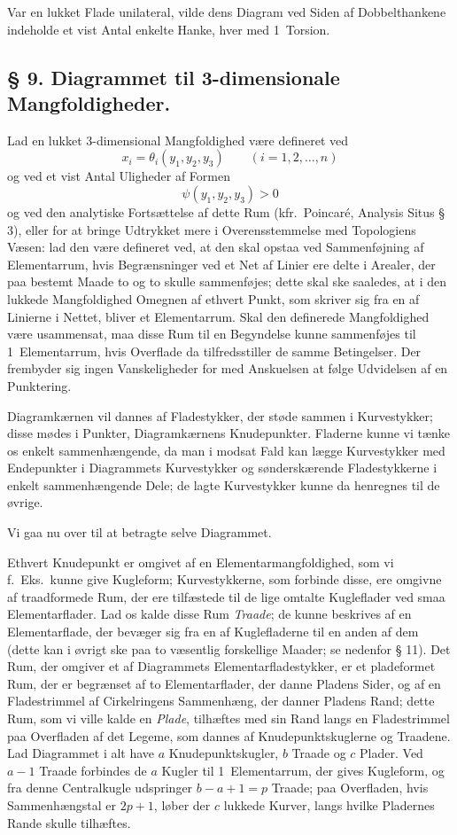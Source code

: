 \documentclass{article}
\begin{document}
Var en lukket Flade unilateral, vilde dens Diagram ved Siden af Dobbelthankene indeholde et vist Antal enkelte Hanke, hver med 1~Torsion.

\subsection*{§ 9. Diagrammet til 3-dimensionale Mangfoldigheder.}

Lad en lukket 3-dimensional Mangfoldighed være defineret ved
\[
x_i = \theta_i(y_1, y_2, y_3) \qquad (i = 1, 2, \dots, n)
\]
og ved et vist Antal Uligheder af Formen
\[
\psi(y_1, y_2, y_3) > 0
\]
og ved den analytiske Fortsættelse af dette Rum (kfr.\ Poincaré, Analysis Situs § 3), eller for at bringe Udtrykket mere i Overensstemmelse med Topologiens Væsen: lad den være defineret ved, at den skal opstaa ved Sammenføjning af Elementarrum, hvis Begrænsninger ved et Net af Linier ere delte i Arealer, der paa bestemt Maade to og to skulle sammenføjes; dette skal ske saaledes, at i den lukkede Mangfoldighed Omegnen af ethvert Punkt, som skriver sig fra en af Linierne i Nettet, bliver et Elementarrum. Skal den definerede Mangfoldighed være usammensat, maa disse Rum til en Begyndelse kunne sammenføjes til 1~Elementarrum, hvis Overflade da tilfredsstiller de samme Betingelser. Der frembyder sig ingen Vanskeligheder for med Anskuelsen at følge Udvidelsen af en Punktering.

Diagramkærnen vil dannes af Fladestykker, der støde sammen i Kurvestykker; disse mødes i Punkter, Diagramkærnens Knudepunkter. Fladerne kunne vi tænke os enkelt sammenhængende, da man i modsat Fald kan lægge Kurvestykker med Endepunkter i Diagrammets Kurvestykker og sønderskærende Fladestykkerne i enkelt sammenhængende Dele; de lagte Kurvestykker kunne da henregnes til de øvrige.

Vi gaa nu over til at betragte selve Diagrammet.

Ethvert Knudepunkt er omgivet af en Elementarmangfoldighed, som vi f.~Eks.\ kunne give Kugleform; Kurvestykkerne, som forbinde disse, ere omgivne af traadformede Rum, der ere tilfæstede til de lige omtalte Kugleflader ved smaa Elementarflader. Lad os kalde disse Rum \emph{Traade}; de kunne beskrives af en Elementarflade, der bevæger sig fra en af Kuglefladerne til en anden af dem (dette kan i øvrigt ske paa to væsentlig forskellige Maader; se nedenfor § 11). Det Rum, der omgiver et af Diagrammets Elementarfladestykker, er et pladeformet Rum, der er begrænset af to Elementarflader, der danne Pladens Sider, og af en Fladestrimmel af Cirkelringens Sammenhæng, der danner Pladens Rand; dette Rum, som vi ville kalde en \emph{Plade}, tilhæftes med sin Rand langs en Fladestrimmel paa Overfladen af det Legeme, som dannes af Knudepunktskuglerne og Traadene. Lad Diagrammet i alt have $a$ Knudepunktskugler, $b$ Traade og $c$ Plader. Ved $a - 1$ Traade forbindes de $a$ Kugler til 1~Elementarrum, der gives Kugleform, og fra denne Centralkugle udspringer $b - a + 1 = p$ Traade; paa Overfladen, hvis Sammenhængstal er $2p + 1$, løber der $c$ lukkede Kurver, langs hvilke Pladernes Rande skulle tilhæftes.
\end{document}
